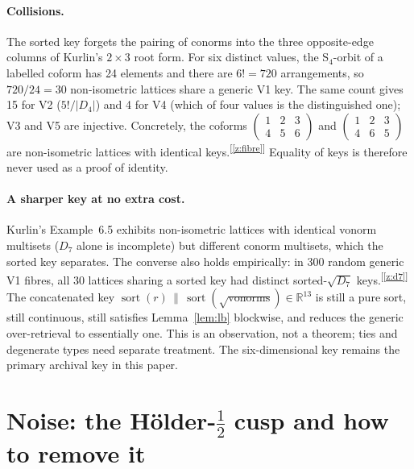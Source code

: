 \documentclass[11pt]{article}
\newcommand{\chk}[1]{\textsuperscript{[\ref{#1}]}}
\begin{document}
\paragraph{Collisions.}
The sorted key forgets the pairing of conorms into the three opposite-edge columns of Kurlin's $2\times3$ root form. For six distinct values, the S$_4$-orbit of a labelled coform has 24 elements and there are $6!=720$ arrangements, so $720/24=30$ non-isometric lattices share a generic V1 key. The same count gives 15 for V2 ($5!/|D_4|$) and 4 for V4 (which of four values is the distinguished one); V3 and V5 are injective. Concretely, the coforms $\begin{pmatrix}1&2&3\\4&5&6\end{pmatrix}$ and $\begin{pmatrix}1&2&3\\4&6&5\end{pmatrix}$ are non-isometric lattices with identical keys.\chk{z:fibre} Equality of keys is therefore never used as a proof of identity.

\paragraph{A sharper key at no extra cost.}
Kurlin's Example~6.5 exhibits non-isometric lattices with identical vonorm multisets ($D_7$ alone is incomplete) but different conorm multisets, which the sorted key separates. The converse also holds empirically: in 300 random generic V1 fibres, all 30 lattices sharing a sorted key had distinct sorted-$\sqrt{D_7}$ keys.\chk{z:d7} The concatenated key $\operatorname{sort}(r)\,\|\,\operatorname{sort}(\sqrt{\text{vonorms}})\in\mathbb R^{13}$ is still a pure sort, still continuous, still satisfies Lemma~\ref{lem:lb} blockwise, and reduces the generic over-retrieval to essentially one. This is an observation, not a theorem; ties and degenerate types need separate treatment. The six-dimensional key remains the primary archival key in this paper.

\section{Noise: the H\"older-$\tfrac12$ cusp and how to remove it}
\label{app:noise}
\end{document}
